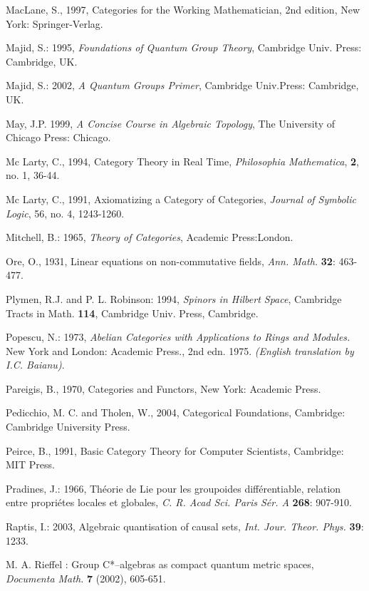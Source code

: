 \documentclass[12pt]{article}
\theoremstyle{plain}
\theoremstyle{definition}
\numberwithin{equation}{section}
\begin{document}
\begin{thebibliography}{99}
MacLane, S., 1997, Categories for the Working Mathematician, 2nd edition, New York: Springer-Verlag.

Majid, S.: 1995, \emph{Foundations of Quantum Group Theory}, Cambridge Univ. Press: Cambridge, UK.

Majid, S.: 2002, \emph{A Quantum Groups Primer}, Cambridge Univ.Press: Cambridge, UK.

May, J.P. 1999, \emph{A Concise Course in Algebraic Topology}, The University of Chicago Press: Chicago.

Mc Larty, C., 1994, Category Theory in Real Time, {\em Philosophia Mathematica}, \textbf{2}, no. 1, 36-44.

Mc Larty, C., 1991, Axiomatizing a Category of Categories, {\em Journal of Symbolic Logic}, 56, no. 4, 1243-1260.


Mitchell, B.: 1965, \emph{Theory of Categories}, Academic Press:London.

Ore, O., 1931, Linear equations on non-commutative fields, {\em Ann. Math.} \textbf{32}: 463-477.


Plymen, R.J. and P. L. Robinson: 1994, \emph{Spinors in Hilbert Space}, Cambridge Tracts in Math.
\textbf{114}, Cambridge Univ. Press, Cambridge.

Popescu, N.: 1973, \emph{Abelian Categories with Applications to Rings and Modules.} New York and London: Academic Press., 2nd edn. 1975. \emph{(English translation by I.C. Baianu)}.

Pareigis, B., 1970, Categories and Functors, New York: Academic Press.

Pedicchio, M. C. and Tholen, W., 2004, Categorical Foundations, Cambridge: Cambridge University Press.

Peirce, B., 1991, Basic Category Theory for Computer Scientists, Cambridge: MIT Press.

Pradines, J.: 1966, Th\'eorie de Lie pour les groupoides diff\'erentiable, relation entre propri\'etes locales et globales, \emph{C. R. Acad Sci. Paris S\'er. A} \textbf{268}: 907-910.

Raptis, I.: 2003, Algebraic quantisation of causal sets, \emph{Int. Jour. Theor. Phys.} \textbf{39}: 1233.

M. A. Rieffel : Group C*--algebras as compact quantum metric spaces, \emph{Documenta Math.} \textbf{7} (2002), 605-651.


\end{thebibliography}
\end{document}
